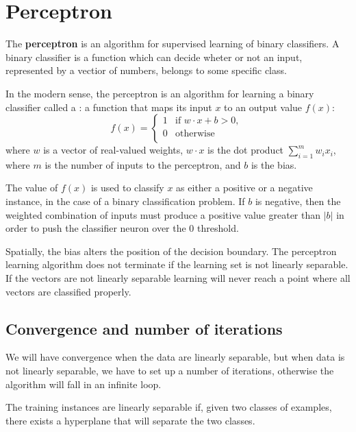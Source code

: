 \section{Perceptron}

The \textbf{perceptron} is an algorithm for supervised learning of binary classifiers. A binary classifier is a function which can decide wheter or not an input, represented by a vectior of numbers, belongs to some specific class. 

In the modern sense, the perceptron is an algorithm for learning a binary classifier called a : a function that maps its input \(x\) to an output value \(f(x)\):
\begin{equation}
    f(x) = \begin{cases}
        1               &\text{if \(w \cdot x + b > 0\), } \\
        0               &\text{otherwise}\\
    \end{cases}
\end{equation}
where \(w\) is a vector of real-valued weights, \(w \cdot x\) is the dot product \(\sum_{i=1}^mw_ix_i\), where \(m\) is the number of inputs to the perceptron, and \(b\) is the bias.

The value of \(f(x)\) is used to classify \(x\) as either a positive or a negative instance, in the case of a binary classification problem. If \(b\) is negative, then the weighted combination of inputs must produce a positive value greater than \(|b|\) in order to push the classifier neuron over the 0 threshold.

Spatially, the bias alters the position of the decision boundary. The perceptron learning algorithm does not terminate if the learning set is not linearly separable. If the vectors are not linearly separable learning will never reach a point where all vectors are classified properly. 

\subsection{Convergence and number of iterations}
We will have convergence when the data are linearly separable, but when data is not linearly separable, we have to set up a number of iterations, otherwise the algorithm will fall in an infinite loop.

The training instances are linearly separable if, given two classes of examples, there exists a hyperplane that will separate the two classes.

